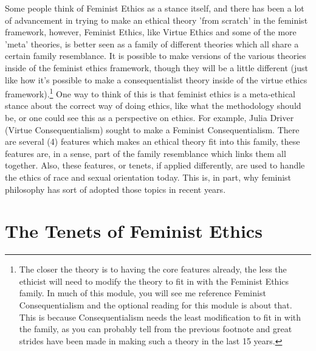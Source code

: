 Some people think of Feminist Ethics as a stance itself, and there has been a lot of advancement in trying to make an ethical theory 'from scratch' in the feminist framework, however, Feminist Ethics, like Virtue Ethics and some of the more 'meta' theories, is better seen as a family of different theories which all share a certain family resemblance. It is possible to make versions of the various theories inside of the feminist ethics framework, though they will be a little different (just like how it’s possible to make a consequentialist theory inside of the virtue ethics framework).\footnote{The closer the theory is to having the core features already, the less the ethicist will need to modify the theory to fit in with the Feminist Ethics family. In much of this module, you will see me reference Feminist Consequentialism and the optional reading for this module is about that. This is because Consequentialism needs the least modification to fit in with the family, as you can probably tell from the previous footnote and great strides have been made in making such a theory in the last 15 years.} One way to think of this is that feminist ethics is a meta-ethical stance about the correct way of doing ethics, like what the methodology should be, or one could see this as a perspective on ethics. For example, Julia Driver (Virtue Consequentialism) sought to make a Feminist Consequentialism. There are several (4) features which makes an ethical theory fit into this family, these features are, in a sense, part of the family resemblance which links them all together. Also, these features, or tenets, if applied differently, are used to handle the ethics of race and sexual orientation today. This is, in part, why feminist philosophy has sort of adopted those topics in recent years. 

\section{The Tenets of Feminist Ethics}

